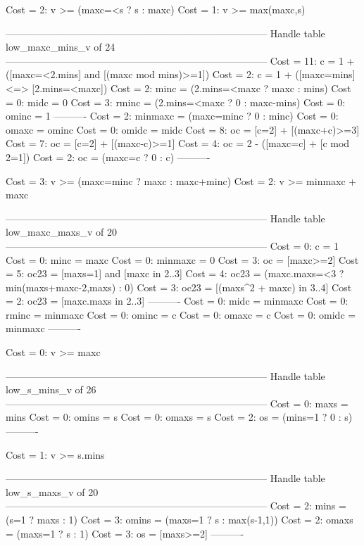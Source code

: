 Cost =  2:  v >= (maxc=<s ? s : maxc)
Cost =  1:  v >= max(maxc,s)

--------------------------------------------------------------------------------
Handle table low_maxc_mins_v of 24
--------------------------------------------------------------------------------
Cost = 11:  c       = 1 + ([maxc=<2.mins] and [(maxc mod mins)>=1])
Cost =  2:  c       = 1 + ([maxc=mins] <=> [2.mins=<maxc])
Cost =  2:  minc    = (2.mins=<maxc ? maxc : mins)
Cost =  0:  midc    = 0
Cost =  3:  rminc   = (2.mins=<maxc ? 0 : maxc-mins)
Cost =  0:  ominc   = 1
----------
Cost =  2:  minmaxc = (maxc=minc ? 0 : minc)
Cost =  0:  omaxc   = ominc
Cost =  0:  omidc   = midc
Cost =  8:  oc      = [c=2] + [(maxc+c)>=3]
Cost =  7:  oc      = [c=2] + [(maxc-c)>=1]
Cost =  4:  oc      = 2 - ([maxc=c] + [c mod 2=1])
Cost =  2:  oc      = (maxc=c ? 0 : c)
----------

Cost =  3:  v >= (maxc=minc ? maxc : maxc+minc)
Cost =  2:  v >= minmaxc + maxc

--------------------------------------------------------------------------------
Handle table low_maxc_maxs_v of 20
--------------------------------------------------------------------------------
Cost =  0:  c       = 1
Cost =  0:  minc    = maxc
Cost =  0:  minmaxc = 0
Cost =  3:  oc      = [maxc>=2]
Cost =  5:  oc23    = [maxs=1] and [maxc in 2..3]
Cost =  4:  oc23    = (maxc.maxs=<3 ? min(maxs+maxc-2,maxs) : 0)
Cost =  3:  oc23    = [(maxs^2 + maxc) in 3..4]
Cost =  2:  oc23    = [maxc.maxs in 2..3]
----------
Cost =  0:  midc    = minmaxc
Cost =  0:  rminc   = minmaxc
Cost =  0:  ominc   = c
Cost =  0:  omaxc   = c
Cost =  0:  omidc   = minmaxc
----------

Cost =  0:  v >= maxc

--------------------------------------------------------------------------------
Handle table low_s_mins_v of 26
--------------------------------------------------------------------------------
Cost =  0:  maxs  = mins
Cost =  0:  omins = s
Cost =  0:  omaxs = s
Cost =  2:  os    = (mins=1 ? 0 : s)
----------

Cost =  1:  v >= s.mins

--------------------------------------------------------------------------------
Handle table low_s_maxs_v of 20
--------------------------------------------------------------------------------
Cost =  2:  mins  = (s=1 ? maxs : 1)
Cost =  3:  omins = (maxs=1 ? s : max(s-1,1))
Cost =  2:  omaxs = (maxs=1 ? s : 1)
Cost =  3:  os    = [maxs>=2]
----------

